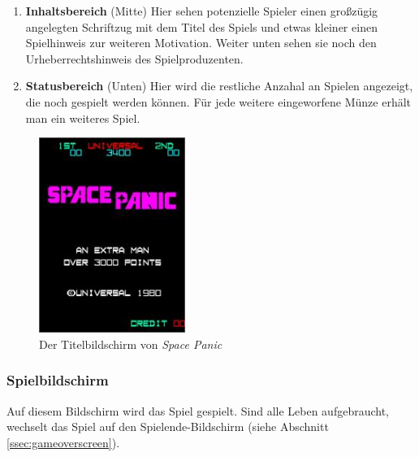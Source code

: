 \documentclass[12pt]{article}
\begin{document}
	
\begin{enumerate}
    \item \textbf{Inhaltsbereich} (Mitte) \newline
    	Hier sehen potenzielle Spieler einen großzügig angelegten Schriftzug mit dem Titel des Spiels und etwas kleiner einen Spielhinweis zur weiteren Motivation. Weiter unten sehen sie noch den Urheberrechtshinweis des Spielproduzenten.
    \item \textbf{Statusbereich} (Unten) \newline
    	Hier wird die restliche Anzahal an Spielen angezeigt, die noch gespielt werden können. Für jede weitere eingeworfene Münze erhält man ein weiteres Spiel.
\end{enumerate}
\begin{figure}[ht]
		\centering
        \includegraphics[height=180pt]{images/titlescreen}
        \caption{Der Titelbildschirm von \textit{Space Panic}}
        \label{fig:spacepanic:titlescreen}
	\end{figure}


\subsubsection{Spielbildschirm} \label{ssec:gamescreen}
	Auf diesem Bildschirm wird das Spiel gespielt. Sind alle Leben aufgebraucht, wechselt das Spiel auf den Spielende-Bildschirm (siehe Abschnitt \ref{ssec:gameoverscreen}).
    
\end{document}
